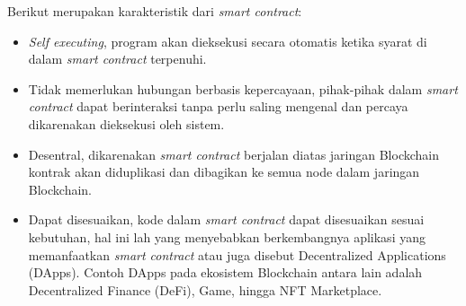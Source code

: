 Berikut merupakan karakteristik dari \emph{smart contract}:
\begin{itemize}
    \item \emph{Self executing}, program akan dieksekusi secara otomatis ketika syarat di dalam \emph{smart contract} terpenuhi.
    \item Tidak memerlukan hubungan berbasis kepercayaan, pihak-pihak dalam \emph{smart contract} dapat berinteraksi tanpa perlu saling mengenal dan percaya dikarenakan dieksekusi oleh sistem.
    \item Desentral, dikarenakan \emph{smart contract} berjalan diatas jaringan Blockchain kontrak akan diduplikasi dan dibagikan ke semua node dalam jaringan Blockchain.
    \item Dapat disesuaikan, kode dalam \emph{smart contract} dapat disesuaikan sesuai kebutuhan, hal ini lah yang menyebabkan berkembangnya aplikasi yang memanfaatkan \emph{smart contract} atau juga disebut Decentralized Applications (DApps). Contoh DApps pada ekosistem Blockchain antara lain adalah Decentralized Finance (DeFi), Game, hingga NFT Marketplace.
  \end{itemize}





